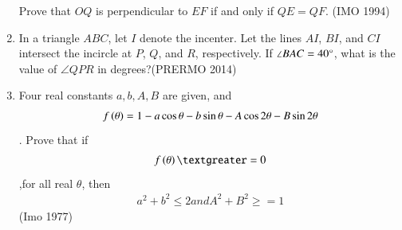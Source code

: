 \begin{enumerate}
		 Prove that $OQ$ is perpendicular to $EF$ if and only if $QE=QF$.    \hfill(IMO 1994)
\item In a triangle $ABC$, let $I$ denote the incenter. Let the lines $AI$, $BI$, and $CI$ intersect the incircle at $P$, $Q$, and $R$, respectively. If $\angle BAC = 40\degree$, what is the value of $\angle QPR$ in degrees?\hfill(PRERMO 2014)
\item Four real constants $a, b, A, B$ are given, and \begin{align}
f\left(\theta\right) = 1 - a\cos\theta - b \sin \theta     - A \cos 2\theta - B \sin 2\theta  
\end{align}. Prove that if 
\begin{align}f\brak{\theta} \textgreater= 0 
	\end{align} ,for all real $\theta$, then
\begin{align} a^{2} + b^{2} \leq 2 and A^{2} + B^{2} \geq = 1 
\end{align}\hfill(Imo 1977)

		
	

\end{enumerate}
